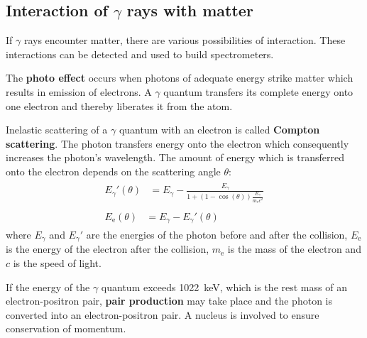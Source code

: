 \subsection*{Interaction of $\gamma$ rays with matter}
If $\gamma$ rays encounter matter, there are various possibilities of interaction. These interactions can be detected and used to build spectrometers.
%
\par
%
The \textbf{photo effect} occurs when photons of adequate energy strike matter which results in emission of electrons.
A $\gamma$ quantum transfers its complete energy onto one electron and thereby liberates it from the atom.
%
\par
%
Inelastic scattering of a $\gamma$ quantum with an electron is called \textbf{Compton scattering}.
The photon transfers energy onto the electron which consequently increases the photon's wavelength.
The amount of energy which is transferred onto the electron depends on the scattering angle $\theta$:
%
\begin{align}
    \label{eq:PhotonNachStoss}
    \begin{split}
        {E_{\gamma}}'(\theta) &= E_{\gamma} - \frac{E_{\gamma}}{1 + \left ( 1 - \cos(\theta) \right ) \frac{E_{\gamma}}{m_{\text{e}} c^2}}
    \end{split}
    \\
    \label{eq:ElektronNachStoss}
    \begin{split}
        E_{\text{e}}(\theta) &= E_{\gamma} - {E_{\gamma}}'(\theta)
    \end{split}
\end{align}
%
where $E_{\gamma}$ and ${E_{\gamma}}'$ are the energies of the photon before and after the collision, $E_{\text{e}}$ is the energy of the electron after the collision, $m_{\text{e}}$ is the mass of the electron and $c$ is the speed of light. \cite{AnleitungZusatz2}
%
\par
%
If the energy of the $\gamma$ quantum exceeds \SI{1022}{\kilo\electronvolt}, which is the rest mass of an electron-positron pair, \textbf{pair production} may take place and the photon is converted into an electron-positron pair.
A nucleus is involved to ensure conservation of momentum.
\cite{AnleitungZusatz1}
%
